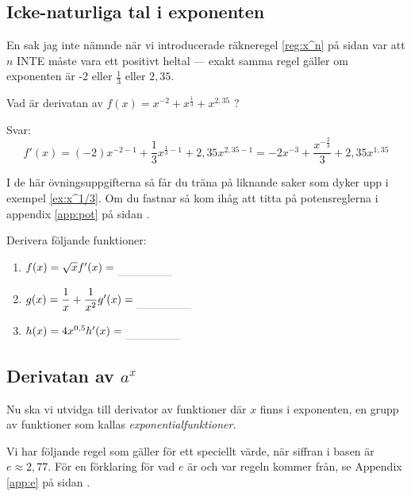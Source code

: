 \documentclass[a4paper, 12pt]{article}
\begin{document}
\subsection{Icke-naturliga tal i exponenten}
En sak jag inte nämnde när vi introducerade räkneregel \ref{reg:x^n} på sidan \pageref{reg:x^n} var att $n$ INTE måste vara ett positivt heltal --- exakt samma regel gäller om exponenten är -2 eller $\frac 13$ eller $2,35$.

\begin{exempel}
    \label{ex:x^1/3}
    Vad är derivatan av $f(x) = x^{-2} + x^{\frac 13} + x^{2,35}$ ?

    Svar:
    \[ f'(x) = (-2)x^{-2-1} + \frac 13 x^{\frac 13 - 1} + 2,35 x^{2,35-1} = -2x^{-3} + \dfrac{x^{-\frac 23}}{3} + 2,35x^{1,35} \]
\end{exempel}

I de här övningsuppgifterna så får du träna på liknande saker som dyker upp i exempel \ref{ex:x^1/3}. Om du fastnar så kom ihåg att titta på potensreglerna i appendix \ref{app:pot} på sidan \pageref{app:pot}.


\begin{uppgifter}
    \label{upp:x^1/3}
    Derivera följande funktioner:
    \begin{multicols}{3}
        \begin{enumerate}
            \item $f(x) = \sqrt{x} \\ f'(x) \ans$
            \item $g(x) = \dfrac 1{x} + \dfrac 1{x^2} \\ g'(x) \ans$
            \item $h(x) = 4x^{0,5} \\ h'(x) \ans$
        \end{enumerate}
    \end{multicols}
\end{uppgifter}

\subsection{Derivatan av $a^x$}
Nu ska vi utvidga till derivator av funktioner där $x$ finns i exponenten, en grupp av funktioner som kallas \emph{exponentialfunktioner.}

Vi har följande regel som gäller för ett speciellt värde, när siffran i basen är $e \approx 2,77$. För en förklaring för vad $e$ är och var regeln kommer från, se Appendix \ref*{app:e} på sidan \pageref*{app:e}.
\end{document}

